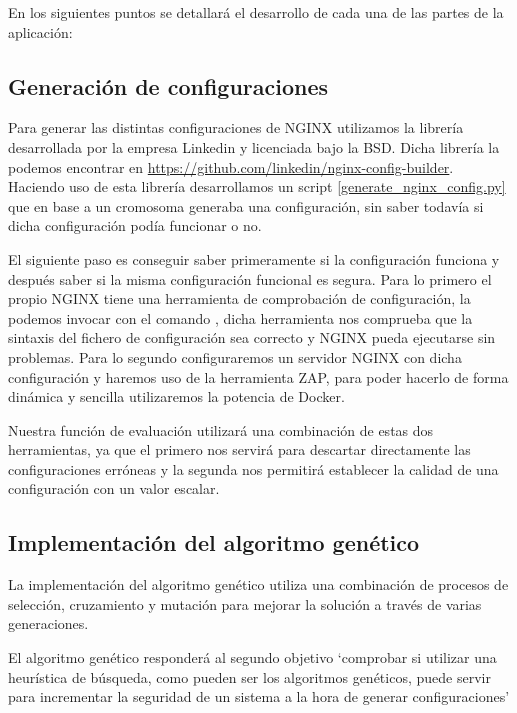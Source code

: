 En los siguientes puntos se detallará el desarrollo de cada una de las partes de la aplicación:

\subsection{Generación de configuraciones}

\bigskip
Para generar las distintas configuraciones de NGINX utilizamos la librería  desarrollada por la empresa Linkedin y licenciada bajo la BSD. Dicha librería la podemos encontrar en \url{https://github.com/linkedin/nginx-config-builder}. Haciendo uso de esta librería desarrollamos un script \ref{generate_nginx_config.py} que en base a un cromosoma generaba una configuración, sin saber todavía si dicha configuración podía funcionar o no.

\bigskip
El siguiente paso es conseguir saber primeramente si la configuración funciona y después saber si la misma configuración funcional es segura. Para lo primero el propio NGINX tiene una herramienta de comprobación de configuración, la podemos invocar con el comando , dicha herramienta nos comprueba que la sintaxis del fichero de configuración sea correcto y NGINX pueda ejecutarse sin problemas. Para lo segundo configuraremos un servidor NGINX con dicha configuración y haremos uso de la herramienta ZAP, para poder hacerlo de forma dinámica y sencilla utilizaremos la potencia de Docker.

\bigskip
Nuestra función de evaluación utilizará una combinación de estas dos herramientas, ya que el primero nos servirá para descartar directamente las configuraciones erróneas y la segunda nos permitirá establecer la calidad de una configuración con un valor escalar.

\subsection{Implementación del algoritmo genético}

La implementación del algoritmo genético utiliza una combinación de procesos de selección, cruzamiento y mutación para mejorar la solución a través de varias generaciones.

\bigskip
El algoritmo genético responderá al segundo objetivo `comprobar si utilizar una heurística de búsqueda, como pueden ser los algoritmos genéticos, puede servir para incrementar la seguridad de un sistema a la hora de generar configuraciones' 

